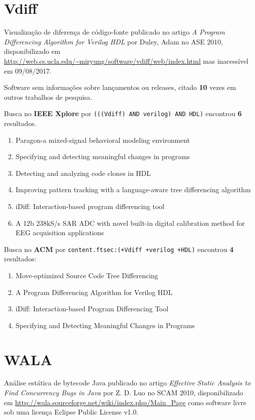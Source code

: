 \section{Vdiff}

Visualização de diferença de código-fonte
publicado no artigo {\it A Program Differencing Algorithm for Verilog HDL}
por Duley, Adam
no ASE 2010,
disponibilizado em \url{http://web.cs.ucla.edu/~miryung/software/vdiff/web/index.html}
mas inacessível em 09/08/2017.

Software sem informações sobre lançamentos ou releases,
citado {\bf 10} vezes em outros trabalhos de pesquisa.

Busca no {\bf IEEE Xplore} por
\texttt{(((Vdiff) AND verilog) AND HDL)}
encontrou {\bf 6}
resultados.

\begin{enumerate}
\item Paragon-a mixed-signal behavioral modeling environment
\item Specifying and detecting meaningful changes in programs
\item Detecting and analyzing code clones in HDL
\item Improving pattern tracking with a language-aware tree differencing algorithm
\item iDiff: Interaction-based program differencing tool
\item A 12b 238kS/s SAR ADC with novel built-in digital calibration method for EEG acquisition applications
\end{enumerate}

Busca no {\bf ACM} por
\texttt{content.ftsec:(+Vdiff +verilog +HDL)}
encontrou {\bf 4}
resultados:

\begin{enumerate}
\item Move-optimized Source Code Tree Differencing
\item A Program Differencing Algorithm for Verilog HDL
\item iDiff: Interaction-based Program Differencing Tool
\item Specifying and Detecting Meaningful Changes in Programs
\end{enumerate}

\section{WALA}

Análise estática de bytecode Java
publicado no artigo {\it Effective Static Analysis to Find Concurrency Bugs in Java}
por Z. D. Luo
no SCAM 2010,
disponibilizado em \url{http://wala.sourceforge.net/wiki/index.php/Main_Page}
como software livre
sob uma licença Eclipse Public License v1.0.

